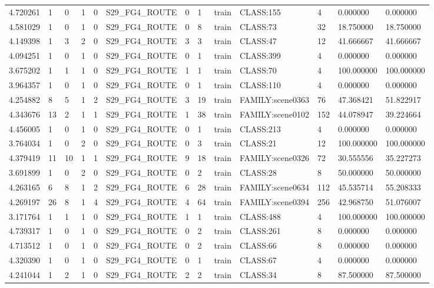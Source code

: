\begin{tabular}{lllllllllllll}
4.720261 & 1 & 0 & 1 & 0 & S29\_FG4\_ROUTE & 0 & 1 & train & CLASS:155 & 4 & 0.000000 & 0.000000 \\
4.581029 & 1 & 0 & 1 & 0 & S29\_FG4\_ROUTE & 0 & 8 & train & CLASS:73 & 32 & 18.750000 & 18.750000 \\
4.149398 & 1 & 3 & 2 & 0 & S29\_FG4\_ROUTE & 3 & 3 & train & CLASS:47 & 12 & 41.666667 & 41.666667 \\
4.094251 & 1 & 0 & 1 & 0 & S29\_FG4\_ROUTE & 0 & 1 & train & CLASS:399 & 4 & 0.000000 & 0.000000 \\
3.675202 & 1 & 1 & 1 & 0 & S29\_FG4\_ROUTE & 1 & 1 & train & CLASS:70 & 4 & 100.000000 & 100.000000 \\
3.964357 & 1 & 0 & 1 & 0 & S29\_FG4\_ROUTE & 0 & 1 & train & CLASS:110 & 4 & 0.000000 & 0.000000 \\
4.254882 & 8 & 5 & 1 & 2 & S29\_FG4\_ROUTE & 3 & 19 & train & FAMILY:scene0363 & 76 & 47.368421 & 51.822917 \\
4.343676 & 13 & 2 & 1 & 1 & S29\_FG4\_ROUTE & 1 & 38 & train & FAMILY:scene0102 & 152 & 44.078947 & 39.224664 \\
4.456005 & 1 & 0 & 1 & 0 & S29\_FG4\_ROUTE & 0 & 1 & train & CLASS:213 & 4 & 0.000000 & 0.000000 \\
3.764034 & 1 & 0 & 2 & 0 & S29\_FG4\_ROUTE & 0 & 3 & train & CLASS:21 & 12 & 100.000000 & 100.000000 \\
4.379419 & 11 & 10 & 1 & 1 & S29\_FG4\_ROUTE & 9 & 18 & train & FAMILY:scene0326 & 72 & 30.555556 & 35.227273 \\
3.691899 & 1 & 0 & 2 & 0 & S29\_FG4\_ROUTE & 0 & 2 & train & CLASS:28 & 8 & 50.000000 & 50.000000 \\
4.263165 & 6 & 8 & 1 & 2 & S29\_FG4\_ROUTE & 6 & 28 & train & FAMILY:scene0634 & 112 & 45.535714 & 55.208333 \\
4.269197 & 26 & 8 & 1 & 4 & S29\_FG4\_ROUTE & 4 & 64 & train & FAMILY:scene0394 & 256 & 42.968750 & 51.076007 \\
3.171764 & 1 & 1 & 1 & 0 & S29\_FG4\_ROUTE & 1 & 1 & train & CLASS:488 & 4 & 100.000000 & 100.000000 \\
4.739317 & 1 & 0 & 1 & 0 & S29\_FG4\_ROUTE & 0 & 2 & train & CLASS:261 & 8 & 0.000000 & 0.000000 \\
4.713512 & 1 & 0 & 1 & 0 & S29\_FG4\_ROUTE & 0 & 2 & train & CLASS:66 & 8 & 0.000000 & 0.000000 \\
4.320390 & 1 & 0 & 1 & 0 & S29\_FG4\_ROUTE & 0 & 1 & train & CLASS:67 & 4 & 0.000000 & 0.000000 \\
4.241044 & 1 & 2 & 1 & 0 & S29\_FG4\_ROUTE & 2 & 2 & train & CLASS:34 & 8 & 87.500000 & 87.500000 \\

\end{tabular}
